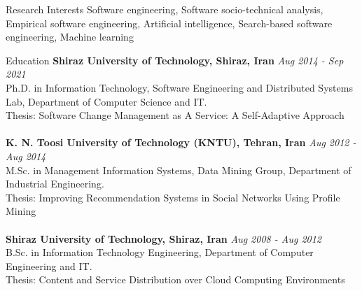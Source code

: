 \documentclass{resume} %
\begin{document}
\begin{rSection}{Research Interests}
Software engineering, Software socio-technical analysis, Empirical software engineering, Artificial intelligence, Search-based software engineering, Machine learning
\end{rSection}




\begin{rSection}{Education}
	{\bf Shiraz University of Technology, Shiraz, Iran } \hfill {\em Aug 2014 - Sep 2021}\\
	Ph.D. in Information Technology, Software Engineering and Distributed Systems Lab, Department of Computer Science and IT.\\
	Thesis: Software Change Management as A Service: A Self-Adaptive Approach\\
	\\{\bf K. N. Toosi University of Technology (KNTU), Tehran, Iran } \hfill {\em Aug 2012 - Aug 2014} 
	\\ M.Sc. in  Management Information Systems, Data Mining Group, Department of Industrial Engineering.\\
	Thesis: Improving Recommendation Systems in Social Networks Using Profile Mining\\
	\\{\bf Shiraz University of Technology, Shiraz, Iran } \hfill {\em Aug 2008 - Aug 2012} 
	\\ B.Sc. in Information Technology Engineering, Department of Computer Engineering and IT.\\
	Thesis: Content and Service Distribution over Cloud Computing Environments
	
\end{rSection}

\end{document}

